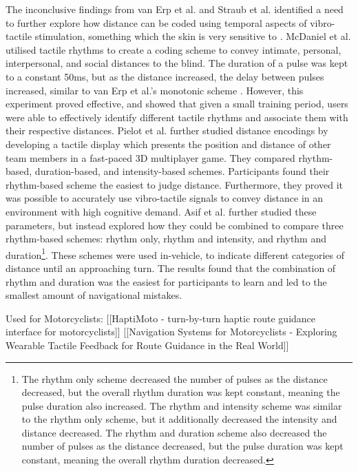 \documentclass{interim}
\begin{document}
The inconclusive findings from van Erp et al. \cite{10.1145/1060581.1060585} and Straub et al. \cite{5326374} identified a need to further explore how distance can be coded using temporal aspects of vibro-tactile stimulation, something which the skin is very sensitive to \cite{doi:10.1068/p5014}. McDaniel et al. \cite{10.1145/1520340.1520718} utilised tactile rhythms to create a coding scheme to convey intimate, personal, interpersonal, and social distances to the blind. The duration of a pulse was kept to a constant 50ms, but as the distance increased, the delay between pulses increased, similar to van Erp et al.'s monotonic scheme \cite{10.1145/1060581.1060585}. However, this experiment proved effective, and showed that given a small training period, users were able to effectively identify different tactile rhythms and associate them with their respective distances. Pielot et al. \cite{10.1145/1753326.1753581} further studied distance encodings by developing a tactile display which presents the position and distance of other team members in a fast-paced 3D multiplayer game. They compared rhythm-based, duration-based, and intensity-based schemes. Participants found their rhythm-based scheme the easiest to judge distance. Furthermore, they proved it was possible to accurately use vibro-tactile signals to convey distance in an environment with high cognitive demand. Asif et al. \cite{10.1145/1868914.1868923} further studied these parameters, but instead explored how they could be combined to compare three rhythm-based schemes: rhythm only, rhythm and intensity, and rhythm and duration\footnote{The rhythm only scheme decreased the number of pulses as the distance decreased, but the overall rhythm duration was kept constant, meaning the pulse duration also increased. The rhythm and intensity scheme was similar to the rhythm only scheme, but it additionally decreased the intensity and distance decreased. The rhythm and duration scheme also decreased the number of pulses as the distance decreased, but the pulse duration was kept constant, meaning the overall rhythm duration decreased.}. These schemes were used in-vehicle, to indicate different categories of distance until an approaching turn. The results found that the combination of rhythm and duration was the easiest for participants to learn and led to the smallest amount of navigational mistakes.

Used for Motorcyclists:
[[HaptiMoto - turn-by-turn haptic route guidance interface for motorcyclists]]
[[Navigation Systems for Motorcyclists - Exploring Wearable Tactile Feedback for Route Guidance in the Real World]]
\end{document}
